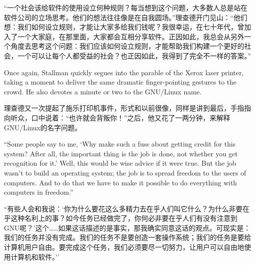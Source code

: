 \ifdefined\chs
``一个社会该给软件的使用设立何种规则？每当想到这个问题，大多数人总是站在软件公司的立场思考。他们的想法往往像是在自我圆场。''理查德开门见山：``他们想：我们如何设立规则，才能让大家多给我们钱呢？我很幸运，在七十年代，曾加入了一个大家庭，在那里面，大家都会互相分享软件。正因如此，我总会从另外一个角度去思考这个问题：我们应该如何设立规则，才能帮助我们构建一个更好的社会，一个可以让每个人都受益的社会？也正因如此，我得到了完全不一样的答案。''
\fi

\ifdefined\eng
Once again, Stallman quickly segues into the parable of the Xerox laser printer, taking a moment to deliver the same dramatic finger-pointing gestures to the crowd. He also devotes a minute or two to the GNU/Linux name.
\fi

\ifdefined\chs
理查德又一次提起了施乐打印机事件，形式和以前很像，同样是讲到最后，手指指向听众，口中说着：``也许就会背叛你！''之后，他又花了一两分钟，来解释GNU/Linux的名字问题。
\fi

\ifdefined\eng
``Some people say to me, `Why make such a fuss about getting credit for this system? After all, the important thing is the job is done, not whether you get recognition for it.' Well, this would be wise advice if it were true. But the job wasn't to build an operating system; the job is to spread freedom to the users of computers. And to do that we have to make it possible to do everything with computers in freedom.''
\fi

\ifdefined\chs
``有些人会和我说：`你为什么要花这么多精力去在乎人们叫它什么？为什么非要在乎这种名利上的事？如今任务已经做完了，你何必非要在乎人们有没有注意到GNU呢？'这个……如果这话描述的是事实，那我确实同意这话的观点。可现实是：我们的任务并没有完成。我们的任务不是要创造一套操作系统；我们的任务是要给计算机用户自由。要完成这个任务，我们必须要尽一切努力，让用户可以自由地使用计算机和软件。''
\fi

